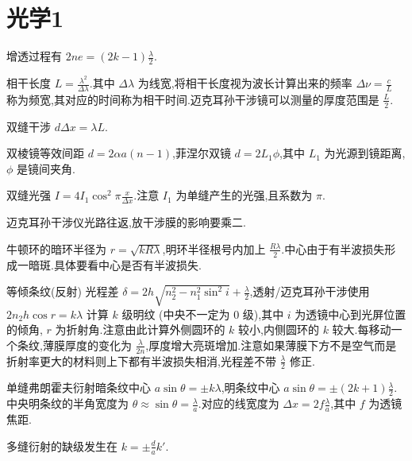 
\usepackage{../../lectures_preamble}


    \section{光学1}
    增透过程有 $2ne=\left( 2k-1 \right) \frac{\lambda}{2}$.

    相干长度 $L=\frac{\lambda^2}{\Delta \lambda}$.其中 $\Delta \lambda$ 为线宽,将相干长度视为波长计算出来的频率 $\Delta \nu= \frac{c}{L}$ 称为频宽,其对应的时间称为相干时间.迈克耳孙干涉镜可以测量的厚度范围是 $\frac{L}{2}$.

    双缝干涉 $d\Delta x=\lambda L$.

    双棱镜等效间距 $d=2\alpha a\left( n-1 \right) $,菲涅尔双镜 $d=2L_1\phi$,其中 $L_1$ 为光源到镜距离, $\phi$ 是镜间夹角.

    双缝光强 $I=4I_1\cos ^2{\pi \frac{x}{\Delta x}}$.注意 $I_1$ 为单缝产生的光强,且系数为 $\pi$.

    迈克耳孙干涉仪光路往返,放干涉膜的影响要乘二.

    牛顿环的暗环半径为 $r=\sqrt{kR\lambda}$,明环半径根号内加上 $\frac{R\lambda}{2}$.中心由于有半波损失形成一暗斑.具体要看中心是否有半波损失.

    等倾条纹(反射) 光程差 $\delta=2h\sqrt{n_2^2-n_1^2\sin^2 i}+\frac{\lambda}{2}$,透射/迈克耳孙干涉使用 $2n_2 h\cos r=k\lambda$ 计算 $k$ 级明纹 (中央不一定为 $0$ 级),其中 $i$ 为透镜中心到光屏位置的倾角, $r$ 为折射角.注意由此计算外侧圆环的 $k$ 较小,内侧圆环的 $k$ 较大.每移动一个条纹,薄膜厚度的变化为 $\frac{\lambda}{2n}$,厚度增大亮斑增加.注意如果薄膜下方不是空气而是折射率更大的材料则上下都有半波损失相消,光程差不带 $\frac{\lambda}{2}$ 修正.

    单缝弗朗霍夫衍射暗条纹中心 $a\sin\theta=\pm k\lambda$,明条纹中心 $a\sin\theta=\pm\left( 2k+1 \right) \frac{\lambda}{2}$.中央明条纹的半角宽度为 $\theta\approx \sin\theta=\frac{\lambda}{a}$.对应的线宽度为 $\Delta x=2f \frac{\lambda}{a}$,其中 $f$ 为透镜焦距.

    多缝衍射的缺级发生在 $k=\pm \frac{d}{a}k'$.

